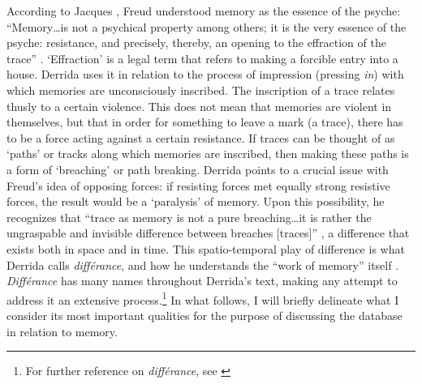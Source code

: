 According to Jacques \textcite{Der78:Wri}, Freud understood memory as the essence of the psyche: ``Memory\dots is not a psychical property among others; it is the very essence of the psyche: resistance, and precisely, thereby, an opening to the effraction of the trace'' \parencite[201]{Der78:Wri}. `Effraction' is a legal term that refers to making a forcible entry into a house. Derrida uses it in relation to the process of impression (pressing \textit{in}) with which memories are unconsciously inscribed. The inscription of a trace relates thusly to a certain violence. This does not mean that memories are violent in themselves, but that in order for something to leave a mark (a trace), there has to be a force acting against a certain resistance. If traces can be thought of as `paths' or tracks along which memories are inscribed, then making these paths is a form of `breaching' or path breaking. Derrida points to a crucial issue with Freud's idea of opposing forces: if resisting forces met equally strong resistive forces, the result would be a `paralysis' of memory. Upon this possibility, he recognizes that ``trace as memory is not a pure breaching\dots it is rather the ungraspable and invisible difference between breaches [traces]'' \parencite[201]{Der78:Wri}, a difference that exists both in space and in time. This spatio-temporal play of difference is what Derrida calls \textit{différance}, and how he understands the ``work of memory'' itself \parencite[226]{Der78:Wri}. \textit{Différance} has many names throughout Derrida's text, making any attempt to address it an extensive process.\footnote{For further reference on \textit{différance}, see \parencites[71-72]{Gra15:The}[219]{Der78:Wri}{Der82:Mar}} In what follows, I will briefly delineate what I consider its most important qualities for the purpose of discussing the database in relation to memory.

